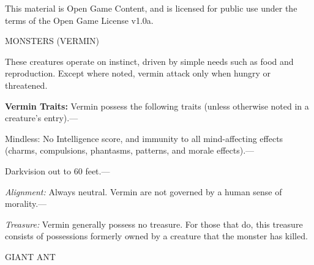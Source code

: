 \documentclass{article}
\begin{document}
This material is Open Game Content, and is licensed for public use under the terms 
of the Open Game License v1.0a.

{\LARGE{}MONSTERS (VERMIN)}

These creatures operate on instinct, driven by simple needs such as food and reproduction. 
Except where noted, vermin attack only when hungry or threatened.

\textbf{Vermin Traits:} Vermin possess the following traits (unless otherwise noted 
in a creature's entry).---

Mindless: No Intelligence score, and immunity to all mind-affecting effects (charms, 
compulsions, phantasms, patterns, and morale effects).---

Darkvision out to 60 feet.---

\textit{Alignment: }Always neutral. Vermin are not governed by a human sense of 
morality.---

\textit{Treasure: }Vermin generally possess no treasure. For those that do, this 
treasure consists of possessions formerly owned by a creature that the monster 
has killed.

\vspace{12pt}
GIANT ANT
\end{document}
